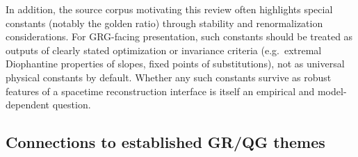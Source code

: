 In addition, the source corpus motivating this review often highlights special constants (notably the golden ratio) through stability and renormalization considerations. For GRG-facing presentation, such constants should be treated as outputs of clearly stated optimization or invariance criteria (e.g.\ extremal Diophantine properties of slopes, fixed points of substitutions), not as universal physical constants by default. Whether any such constants survive as robust features of a spacetime reconstruction interface is itself an empirical and model-dependent question.

\subsection{Connections to established GR/QG themes}\label{sec:discussion:connections}

